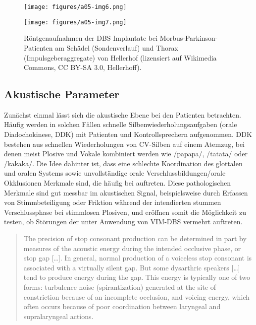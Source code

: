 \begin{figure}
	\begin{minipage}[b]{0.4\textwidth}
		\texttt{[image: figures/a05-img6.png]}
	\end{minipage}
	\hfill
	\begin{minipage}[b]{0.4\textwidth}
		\texttt{[image: figures/a05-img7.png]}
	\end{minipage}
	\caption{Röntgenaufnahmen der DBS Implantate bei Morbus-Parkinson-Patienten am Schädel (Sondenverlauf) und Thorax (Impulsgeberaggregate) von Hellerhof (lizensiert auf Wikimedia Commons, CC BY-SA 3.0, Hellerhoff).}
	\label{figure:0407}
\end{figure}

\subsection{Akustische Parameter}
\label{subsec:040202}

Zunächst einmal lässt sich die akustische Ebene bei den Patienten betrachten. Häufig werden in solchen Fällen schnelle Silbenwiederholungsaufgaben (orale Diadochokinese, DDK) mit Patienten und Kontrollsprechern aufgenommen. DDK bestehen aus schnellen Wiederholungen von CV-Silben auf einem Atemzug, bei denen meist Plosive und Vokale kombiniert werden wie /papapa/, /tatata/ oder /kakaka/. Die Idee dahinter ist, dass eine schlechte Koordination des glottalen und oralen Systems \citep{Kent1999, Weismer1984, Ackermann1991, Pützer2007} sowie unvollständige orale Verschlussbildungen/orale Okklusionen
\citep[vgl.][]{Ziegler1983, Kent1999, Logeman1981, Weismer1984, Ackermann1995, Kent1982, Schweitzer2005} Merkmale sind, die häufig bei  auftreten. Diese pathologischen Merkmale sind gut messbar im akustischen Signal, beispielsweise durch Erfassen von Stimmbeteiligung oder Friktion während der intendierten stummen Verschlussphase bei stimmlosen Plosiven, und eröffnen somit die Möglichkeit zu testen, ob Störungen der  unter Anwendung von VIM-DBS vermehrt auftreten. 

\begin{quote}
	The precision of stop consonant production can be determined in part by measures of the acoustic energy during the intended occlusive phase, or stop gap [\dots]. In general, normal production of a voiceless stop consonant is associated with a virtually silent gap. But some dysarthric speakers [\dots] tend to produce energy during the gap. This energy is typically one of two forms: turbulence noise (spirantization) generated at the site of  constriction because of an incomplete occlusion, and voicing energy, which often occurs because of poor coordination between laryngeal and supralaryngeal actions. \citep[][157--158]{Kent1999}
\end{quote}

